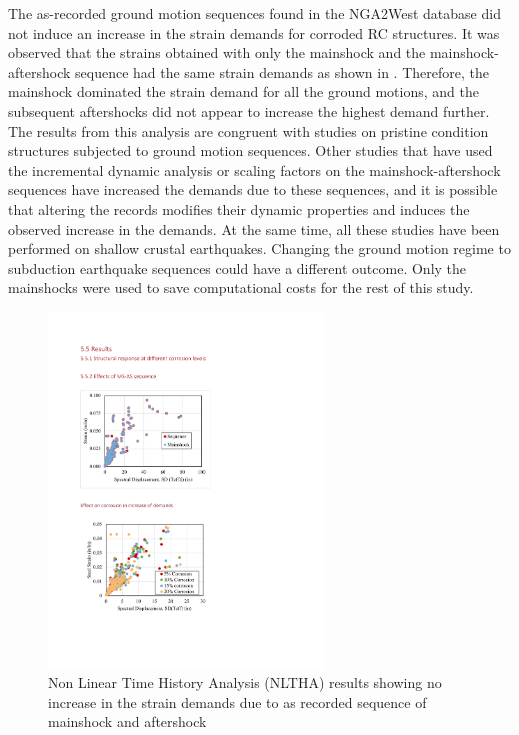 The as-recorded ground motion sequences found in the NGA2West database \cite{Ancheta2014} did not induce an increase in the strain demands for corroded RC structures. It was observed that the strains obtained with only the mainshock and the mainshock-aftershock sequence had the same strain demands as shown in . Therefore, the mainshock dominated the strain demand for all the ground motions, and the subsequent aftershocks did not appear to increase the highest demand further. The results from this analysis are congruent with studies on pristine condition structures subjected to ground motion sequences\cite{Ruiz-Garcia2011}\cite{Zhai2014}. Other studies that have used the incremental dynamic analysis or scaling factors on the mainshock-aftershock sequences have increased the demands due to these sequences, and it is possible that altering the records modifies their dynamic properties and induces the observed increase in the demands\cite{Raghunandan2015}\cite{Tesfamariam2015}. At the same time, all these studies have been performed on shallow crustal earthquakes. Changing the ground motion regime to subduction earthquake sequences could have a different outcome. Only the mainshocks were used to save computational costs for the rest of this study.

\begin{figure}[htbp]
	\centering
	\includegraphics[width=0.65\textwidth]{VAC Thesis 2.0/Chapter-5/figs/MS_AS_results_noincrease_in_demands.pdf}
	\caption{Non Linear Time History Analysis (NLTHA) results showing no increase in the strain demands due to as recorded sequence of mainshock and aftershock}
	\label{fig:ms_as_results}
\end{figure}

